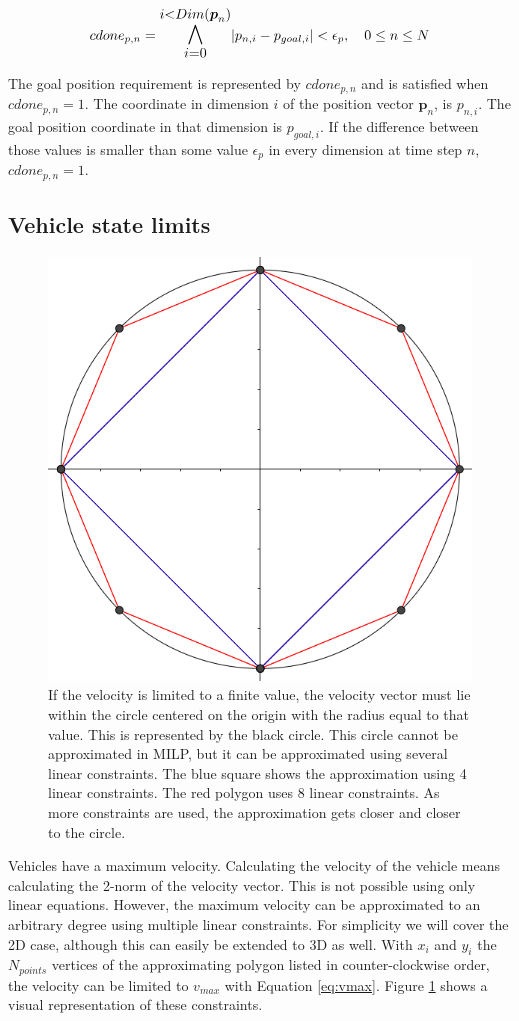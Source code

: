 \begin{equation}
\label{eq:cfin-p}
cdone_{p,n} =  \mathlarger{\mathlarger{\bigwedge_{i = 0}^{i < Dim(\boldsymbol{p}_n)}}} |p_{n,i} - p_{goal, i}| < \epsilon_{p},  \quad 0 \leq n \leq N
\end{equation}

The goal position requirement is represented by $cdone_{p,n}$ and is satisfied when $cdone_{p,n} = 1$. The coordinate in dimension $i$ of the position vector $\boldsymbol{p}_n$, is $p_{n,i}$. The goal position coordinate in that dimension is $p_{goal, i}$. If the difference between those values is smaller than some value $\epsilon_p$ in every dimension at time step $n$,  $cdone_{p,n} = 1$.

\subsection{Vehicle state limits}
\begin{figure}
    \centering
        \includegraphics[width=0.6\columnwidth]{img/circlelinear}
    \caption{If the velocity is limited to a finite value, the velocity vector must lie within the circle centered on the origin with the radius equal to that value. This is represented by the black circle. This circle cannot be approximated in MILP, but it can be approximated using several linear constraints. The blue square shows the approximation using 4 linear constraints. The red polygon uses 8 linear constraints. As more constraints are used, the approximation gets closer and closer to the circle. }\label{fig:circlelinear}
\end{figure}
Vehicles have a maximum velocity. Calculating the velocity of the vehicle means calculating the 2-norm of the velocity vector. This is not possible using only linear equations. However, the maximum velocity can be approximated to an arbitrary degree using multiple linear constraints. For simplicity we will cover the 2D case, although this can easily be extended to 3D as well. With $x_i$ and $y_i$ the $N_{points}$ vertices of the approximating polygon listed in counter-clockwise order, the velocity can be limited to $v_{max}$ with Equation \ref{eq:vmax}. Figure \ref{fig:circlelinear} shows a visual representation of these constraints.
